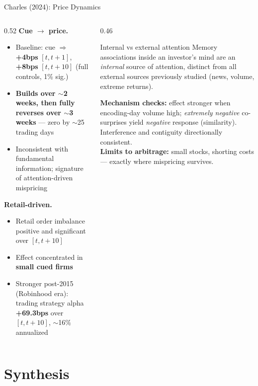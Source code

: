 \documentclass[aspectratio=169, 11pt]{beamer}
\begin{document}
\begin{frame}[shrink=5]{Charles (2024): Price Dynamics}
\begin{columns}[T]
\begin{column}{0.52\textwidth}
\textbf{Cue $\to$ price.}
\begin{itemize}
\item Baseline: cue $\Rightarrow$ \textbf{+4bps} $[t,t+1]$, \textbf{+8bps} $[t,t+10]$ (full controls, 1\% sig.)
\item \textbf{Builds over $\sim$2 weeks, then fully reverses over $\sim$3 weeks} --- zero by $\sim$25 trading days
\item Inconsistent with fundamental information; signature of attention-driven mispricing
\end{itemize}
\textbf{Retail-driven.}
\begin{itemize}
\item Retail order imbalance positive and significant over $[t,t+10]$
\item Effect concentrated in \textbf{small cued firms}
\item Stronger post-2015 (Robinhood era): trading strategy alpha \textbf{+69.3bps} over $[t,t+10]$, $\sim$16\% annualized
\end{itemize}
\end{column}
\begin{column}{0.46\textwidth}
\begin{alertblock}{Internal vs external attention}
Memory associations inside an investor's mind are an \emph{internal} source of attention, distinct from all external sources previously studied (news, volume, extreme returns).
\end{alertblock}
\vspace{0.3em}
\footnotesize
\textbf{Mechanism checks:} effect stronger when encoding-day volume high; \emph{extremely negative} co-surprises yield \emph{negative} response (similarity). Interference and contiguity directionally consistent.
\\[0.3em]
\textbf{Limits to arbitrage:} small stocks, shorting costs --- exactly where mispricing survives.
\end{column}
\end{columns}
\end{frame}

\section{Synthesis}
\end{document}
